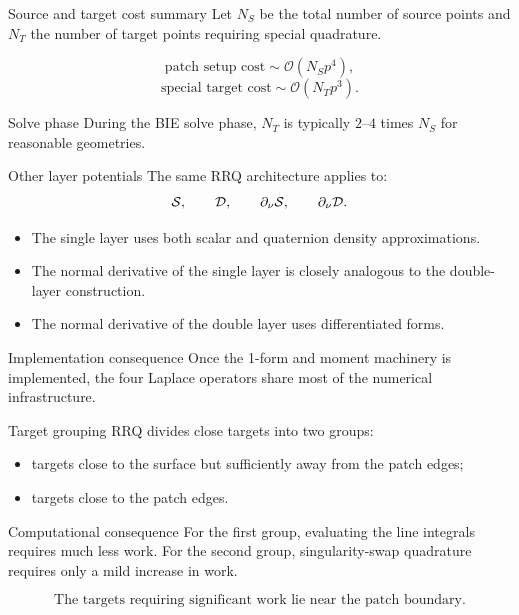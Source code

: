 \documentclass[aspectratio=169,11pt]{beamer}
\newcommand{\cO}{\mathcal{O}}
\begin{document}
\begin{frame}{Source and target cost summary}
\small
Let $N_S$ be the total number of source points and $N_T$ the number of target
points requiring special quadrature.

\[
  \text{patch setup cost}\sim \cO(N_Sp^4),
\]
\[
  \text{special target cost}\sim \cO(N_Tp^3).
\]

\begin{block}{Solve phase}
During the BIE solve phase, $N_T$ is typically $2$--$4$ times $N_S$ for
reasonable geometries.
\end{block}
\end{frame}

\begin{frame}{Other layer potentials}
\small
The same RRQ architecture applies to:
\[
  \mathcal{S},\qquad \mathcal{D},\qquad \partial_\nu\mathcal{S},\qquad \partial_\nu\mathcal{D}.
\]

\begin{itemize}
  \item The single layer uses both scalar and quaternion density approximations.
  \item The normal derivative of the single layer is closely analogous to the
  double-layer construction.
  \item The normal derivative of the double layer uses differentiated forms.
\end{itemize}

\begin{block}{Implementation consequence}
Once the 1-form and moment machinery is implemented, the four Laplace operators
share most of the numerical infrastructure.
\end{block}
\end{frame}

\begin{frame}{Target grouping}
\small
RRQ divides close targets into two groups:
\begin{itemize}
  \item targets close to the surface but sufficiently away from the patch edges;
  \item targets close to the patch edges.
\end{itemize}

\begin{block}{Computational consequence}
For the first group, evaluating the line integrals requires much less work. For
the second group, singularity-swap quadrature requires only a mild increase in work.
\end{block}

\[
  \text{The targets requiring significant work lie near the patch boundary.}
\]
\end{frame}
\end{document}
